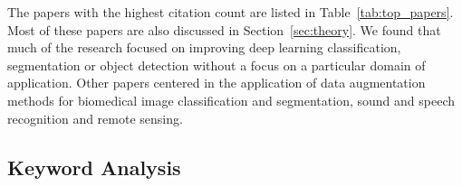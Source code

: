 \documentclass[parskip=full]{scrartcl}
\begin{document}
\begin{table}[H]
    \centering
    \vspace{.2cm}
    \caption{\label{tab:top_conferences}
        Top conferences focusing on data augmentation techniques, sorted by
        citations per document.
    }
\end{table}

The papers with the highest citation count are listed in
Table~\ref{tab:top_papers}. Most of these papers are also discussed in
Section~\ref{sec:theory}. We found that much of the research focused on
improving deep learning classification, segmentation or object detection
without a focus on a particular domain of application. Other papers
centered in the application of data augmentation methods for biomedical image
classification and segmentation, sound and speech recognition and remote
sensing. 

\begin{table}[H]
    \centering
    \vspace{.2cm}
    \caption{\label{tab:top_papers}
        Top papers using data augmentation techniques, sorted by citation
        count.
    }
\end{table}


\subsection{Keyword Analysis}
\end{document}
